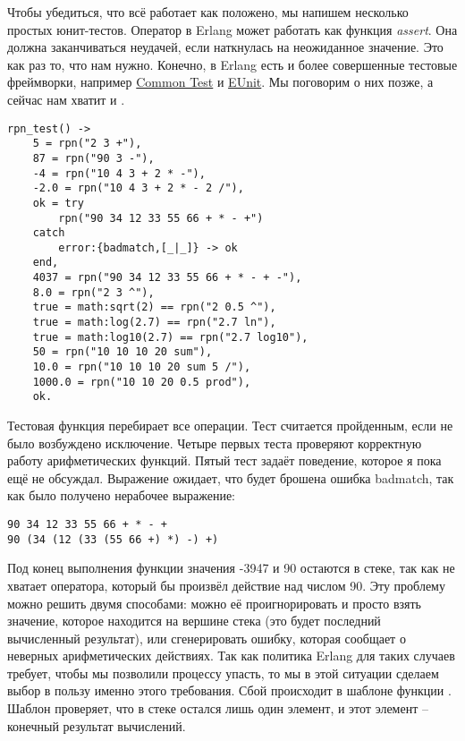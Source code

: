 Чтобы убедиться, что всё работает как положено, мы напишем несколько простых юнит\--тестов.
Оператор \ops{=\strut} в Erlang может работать как функция \emph{assert}.
Она должна заканчиваться неудачей, если наткнулась на неожиданное значение.
Это как раз то, что нам нужно.
Конечно, в Erlang есть и более совершенные тестовые фреймворки, например \href{http://erlang.org/doc/apps/common_test/write_test_chapter.html}{Common Test} и \href{http://erlang.org/doc/apps/eunit/chapter.html}{EUnit}.
Мы поговорим о них позже, а сейчас нам хватит и \ops{=\strut}.
\begin{lstlisting}[style=erlang]
rpn_test() ->
    5 = rpn("2 3 +"),
    87 = rpn("90 3 -"),
    -4 = rpn("10 4 3 + 2 * -"),
    -2.0 = rpn("10 4 3 + 2 * - 2 /"),
    ok = try
        rpn("90 34 12 33 55 66 + * - +")
    catch
        error:{badmatch,[_|_]} -> ok
    end,
    4037 = rpn("90 34 12 33 55 66 + * - + -"),
    8.0 = rpn("2 3 ^"),
    true = math:sqrt(2) == rpn("2 0.5 ^"),
    true = math:log(2.7) == rpn("2.7 ln"),
    true = math:log10(2.7) == rpn("2.7 log10"),
    50 = rpn("10 10 10 20 sum"),
    10.0 = rpn("10 10 10 20 sum 5 /"),
    1000.0 = rpn("10 10 20 0.5 prod"),
    ok.
\end{lstlisting}

Тестовая функция перебирает все операции.
Тест считается пройденным, если не было возбуждено исключение.
Четыре первых теста проверяют корректную работу арифметических функций.
Пятый тест задаёт поведение, которое я пока ещё не обсуждал.
Выражение  ожидает, что будет брошена  ошибка badmatch, так как было получено нерабочее выражение:
\begin{lstlisting}[style=erlang]
90 34 12 33 55 66 + * - +
90 (34 (12 (33 (55 66 +) *) -) +)
\end{lstlisting}

Под конец выполнения функции  значения -3947 и 90 остаются в стеке, так как не хватает оператора, который бы произвёл действие над числом 90.
Эту проблему можно решить двумя способами: можно её проигнорировать и просто взять значение, которое находится на вершине стека (это будет последний вычисленный результат), или сгенерировать ошибку, которая сообщает о неверных арифметических действиях.
Так как политика Erlang для таких случаев требует, чтобы мы позволили процессу упасть, то мы в этой ситуации сделаем выбор в пользу именно этого требования.
Сбой происходит в шаблоне \ops{[Res]} функции .
Шаблон проверяет, что в стеке остался лишь один элемент, и этот элемент \--- конечный результат вычислений.

